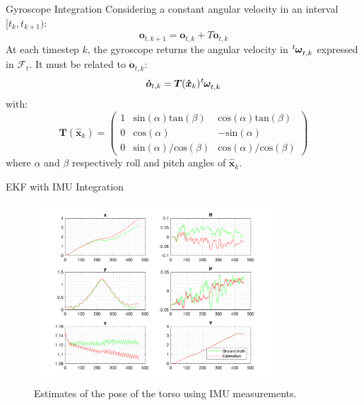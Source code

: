 \documentclass[10pt]{beamer}
\begin{document}
    \begin{frame}{Gyroscope Integration}
        Considering a constant angular velocity in an interval $[t_k, t_{k+1})$:
        \begin{equation*}
            \bm{o}_{t,k+1} = \bm{o}_{t,k} + T \bm{\dot{o}}_{t,k}
        \end{equation*}
        At each timestep $k$, the gyroscope returns the angular velocity in
        $\tensor[^t]{\bm{\omega}}{_{t,k}}$ expressed in $\mathcal{F}_t$.
        It must be related to $\bm{\dot{o}}_{t,k}$:
        \begin{equation*}
            \bm{\dot{o}}_{t,k} = \bm{T}(\bm{\hat{x}}_{k}) \tensor[^t]{\bm{\omega}}{_{t,k}}
        \end{equation*}
        with:
        \begin{equation*}
            \bm{T}(\bm{\hat{x}}_{k}) =
            \begin{pmatrix}
                1 & \text{sin}(\alpha) \text{tan}(\beta) & \text{cos}(\alpha) \text{tan}(\beta) \\
        		0 & \text{cos}(\alpha) & -\text{sin}(\alpha) \\
        		0 & \text{sin}(\alpha)/\text{cos}(\beta) & \text{cos}(\alpha)/\text{cos}(\beta)
            \end{pmatrix}
        \end{equation*}
        where $\alpha$ and $\beta$  respectively
        roll and pitch angles of $\bm{\hat{x}}_{k}$.
    \end{frame}

    \begin{frame}{EKF with IMU Integration}
        \begin{figure}
        \caption{Estimates of the pose of the torso using IMU measurements.}
        \vspace{-0.3cm}
        \includegraphics[width=0.8\textwidth]{images/accelerometer.png}
        \end{figure}
    \end{frame}
\end{document}
